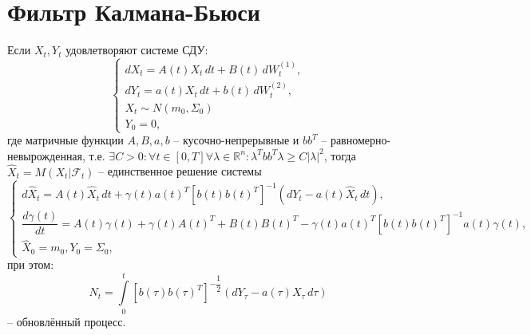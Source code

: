 \section{Фильтр Калмана-Бьюси}

%
%

\begin{theorem}
  Если $X_t, Y_t$ удовлетворяют системе СДУ:
  \[
    \begin{cases}
      dX_t = A(t) X_t \, dt + B(t) \, dW_t^{(1)}, \\
      dY_t = a(t) X_t \, dt + b(t) \, dW_t^{(2)}, \\
      X_t \sim N(m_0, \Sigma_0) \\
      Y_0 = 0,
    \end{cases}
  \]
  где матричные функции $A, B, a, b$ -- кусочно-непрерывные и $bb^T$ -- равномерно-невырожденная,
  т.е. $\exists C>0 : \forall t\in[0, T] \forall \lambda \in \mathbb{R}^n : \lambda^T bb^T \lambda \geqslant C |\lambda|^2$,
  тогда $\hat{X}_t = M(X_t | \mathcal{F}_t)$ -- единственное решение системы
  \[
    \begin{cases}
      d\hat{X}_t = A(t) \hat{X}_t \, dt + \gamma(t) a(t)^T [b(t) b(t)^T]^{-1} (dY_t - a(t) \hat{X}_t \, dt), \\
      \dfrac{d\gamma(t)}{dt} = A(t) \gamma(t) + \gamma(t) A(t)^T + B(t) B(t)^T - \gamma(t) a(t)^T [b(t) b(t)^T]^{-1} a(t) \gamma(t), \\
      \hat{X}_0 = m_0, Y_0 = \Sigma_0,
    \end{cases}
  \]
  при этом:
  \[
    N_t = \int\limits_0^t [b(\tau) b(\tau)^T]^{-\dfrac{1}{2}} \left( dY_\tau - a(\tau) X_\tau \, d\tau \right)
  \]
  -- обновлённый процесс.
\end{theorem}

